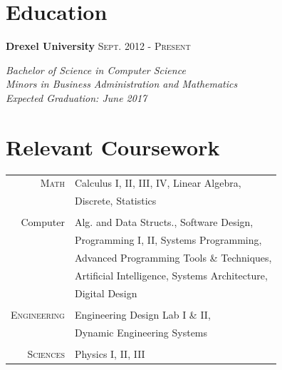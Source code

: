 \documentclass[10pt]{article}
\begin{document}
{\begin{minipage}[t]{0.44\textwidth}

\section{Education} 

\textbf{Drexel University} \hfill \textsc{Sept. 2012 - Present}

\textit{\hspace*{5 mm}Bachelor of Science in Computer Science}\\
\textit{\hspace*{5 mm}Minors in Business Administration and Mathematics}\\
\textit{\hspace*{5 mm}Expected Graduation: June 2017}\\



\section{Relevant Coursework} 


\begin{tabular}{rl}
\textsc{Math}
& Calculus I, II, III, IV, Linear Algebra, \\
& Discrete, Statistics\\\\
Computer
& Alg. and Data Structs., Software Design, \\
& Programming I, II, Systems Programming, \\
& Advanced Programming Tools \& Techniques, \\
& Artificial Intelligence, Systems Architecture, \\
& Digital Design \\\\
\textsc{Engineering}
& Engineering Design Lab I \& II, \\
& Dynamic Engineering Systems\\\\
\textsc{Sciences}
& Physics I, II, III
\end{tabular}\\[10pt]



\end{minipage}}
\end{document}
